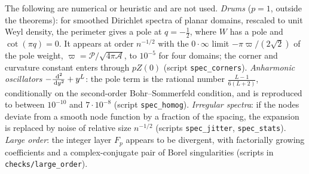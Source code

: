 \begin{remark}\label{rem:further}
The following are numerical or heuristic and are not used. \emph{Drums} ($p=1$, outside the theorems): for smoothed Dirichlet spectra of planar
domains, rescaled to unit Weyl density, the perimeter gives a pole at $q=-\frac12$, where $W$ has a pole and $\cot(\pi q)=0$. It appears at order
$n^{-1/2}$ with the $0\cdot\infty$ limit $-\pi\varpi/(2\sqrt2)$ of the pole weight, $\varpi=\mathcal P/\sqrt{4\pi\mathcal A}$, to $10^{-5}$ for four
domains; the corner and curvature constant enters through $pZ(0)$ (script \texttt{spec\_corners}). \emph{Anharmonic oscillators}
$-\frac{\,\mathrm{d}^2}{\,\mathrm{d} y^2}+y^L$: the pole term is the rational number $\frac{L-1}{6(L+2)}$, conditionally on the second-order Bohr--Sommerfeld
condition, and is reproduced to between $10^{-10}$ and $7\cdot10^{-8}$ (script \texttt{spec\_homog}).
\emph{Irregular spectra}: if the nodes deviate from a smooth node function by a fraction of the spacing, the expansion is replaced by noise of
relative size $n^{-1/2}$ (scripts \texttt{spec\_jitter}, \texttt{spec\_stats}). \emph{Large order}: the integer layer $F_p$ appears to be
divergent, with factorially growing coefficients and a complex-conjugate pair of Borel singularities (scripts in \texttt{checks/large\_order}).
\end{remark}

